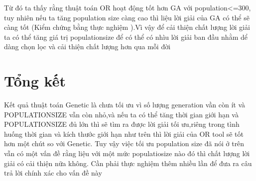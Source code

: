 \documentclass{article}
\begin{document}
Từ đó ta thấy rằng thuật toán OR hoạt động tốt hơn GA với population<=300, tuy nhiên nếu ta tăng population size càng cao thì liệu lời giải của GA có thể sẽ càng tốt (Kiểm chứng bằng thực nghiệm ).Vì vậy để cải thiện chất lượng lời giải ta có thể tăng giá trị populationsize để có thể có nhìu lời giải ban đầu nhằm dể dàng chọn lọc và cải thiện chất lượng hơn qua mỗi đời
\section{Tổng kết}
Kết quả thuật toán Genetic là chưa tối ưu vì số lượng generation vần còn ít và POPULATIONSIZE vẫn còn nhỏ,và nếu ta có thể tăng thời gian giới hạn và POPULATIONSIZE đủ lớn thì sẽ tìm ra được lời giải tối ưu,riêng trong tình huống thời gian và kích thước giới hạn như trên thì lời giải của OR tool sẽ tốt hơn một chút so với Genetic. Tuy vậy việc tối ưu population size đã nói ở trên vẫn có một vấn đề rằng liệu với một mức populatiosize nào đó thì chất lượng lời giải có cải thiện nữa không. Cần phải thực nghiệm thêm nhiều lần để đưa ra câu trả lời chính xác cho vấn đề này
\end{document}
